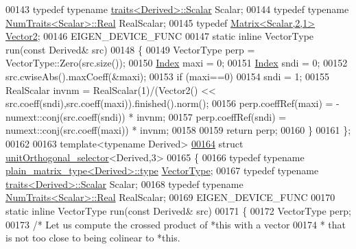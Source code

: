 \begin{DoxyCode}
00143   \textcolor{keyword}{typedef} \textcolor{keyword}{typename} \hyperlink{struct_eigen_1_1internal_1_1traits}{traits<Derived>::Scalar} Scalar;
00144   \textcolor{keyword}{typedef} \textcolor{keyword}{typename} \hyperlink{group___core___module_struct_eigen_1_1_num_traits}{NumTraits<Scalar>::Real} RealScalar;
00145   \textcolor{keyword}{typedef} \hyperlink{group___core___module_class_eigen_1_1_matrix}{Matrix<Scalar,2,1>} \hyperlink{group___core___module_class_eigen_1_1_matrix}{Vector2};
00146   EIGEN\_DEVICE\_FUNC
00147   \textcolor{keyword}{static} \textcolor{keyword}{inline} VectorType run(\textcolor{keyword}{const} Derived& src)
00148   \{
00149     VectorType perp = VectorType::Zero(src.size());
00150     \hyperlink{namespace_eigen_a62e77e0933482dafde8fe197d9a2cfde}{Index} maxi = 0;
00151     \hyperlink{namespace_eigen_a62e77e0933482dafde8fe197d9a2cfde}{Index} sndi = 0;
00152     src.cwiseAbs().maxCoeff(&maxi);
00153     \textcolor{keywordflow}{if} (maxi==0)
00154       sndi = 1;
00155     RealScalar invnm = RealScalar(1)/(Vector2() << src.coeff(sndi),src.coeff(maxi)).finished().norm();
00156     perp.coeffRef(maxi) = -numext::conj(src.coeff(sndi)) * invnm;
00157     perp.coeffRef(sndi) =  numext::conj(src.coeff(maxi)) * invnm;
00158 
00159     \textcolor{keywordflow}{return} perp;
00160    \}
00161 \};
00162 
00163 \textcolor{keyword}{template}<\textcolor{keyword}{typename} Derived>
\hyperlink{struct_eigen_1_1internal_1_1unit_orthogonal__selector_3_01_derived_00_013_01_4}{00164} \textcolor{keyword}{struct }\hyperlink{struct_eigen_1_1internal_1_1unit_orthogonal__selector}{unitOrthogonal\_selector}<Derived,3>
00165 \{
00166   \textcolor{keyword}{typedef} \textcolor{keyword}{typename} \hyperlink{struct_eigen_1_1internal_1_1plain__matrix__type}{plain\_matrix\_type<Derived>::type} 
      \hyperlink{struct_vector_type}{VectorType};
00167   \textcolor{keyword}{typedef} \textcolor{keyword}{typename} \hyperlink{struct_eigen_1_1internal_1_1traits}{traits<Derived>::Scalar} Scalar;
00168   \textcolor{keyword}{typedef} \textcolor{keyword}{typename} \hyperlink{group___core___module_struct_eigen_1_1_num_traits}{NumTraits<Scalar>::Real} RealScalar;
00169   EIGEN\_DEVICE\_FUNC
00170   \textcolor{keyword}{static} \textcolor{keyword}{inline} VectorType run(\textcolor{keyword}{const} Derived& src)
00171   \{
00172     VectorType perp;
00173     \textcolor{comment}{/* Let us compute the crossed product of *this with a vector}
00174 \textcolor{comment}{     * that is not too close to being colinear to *this.}

\end{DoxyCode}
